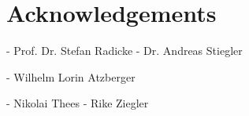 \chapter{Acknowledgements}

- Prof. Dr. Stefan Radicke
- Dr. Andreas Stiegler

- Wilhelm Lorin Atzberger

- Nikolai Thees
- Rike Ziegler
